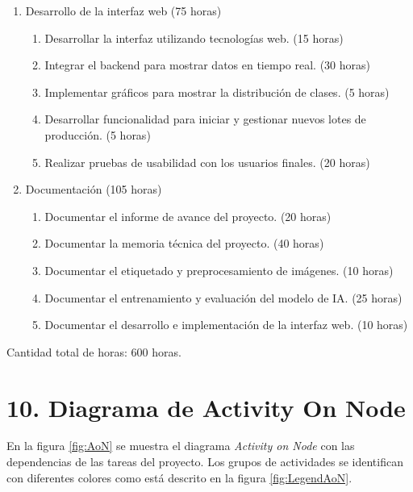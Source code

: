 \documentclass[
11pt, %
]{charter}
\begin{document}
\begin{enumerate}
\begin{enumerate}
	\item Seleccionar y configurar el modelo de IA apropiado. (20 horas)
	\item Entrenar el modelo utilizando las imágenes etiquetadas. (90 horas)
	\item Realizar pruebas de las distintas versiones del modelo con los colaboradores. (20 horas)
	\item Implementar en cada cámara el umbral a partir del cual se contabilizan los nuggets. (30 horas)
	\end{enumerate}
\item Desarrollo de la interfaz web (75 horas)
	\begin{enumerate}
	\item Desarrollar la interfaz utilizando tecnologías web. (15 horas)
	\item Integrar el backend para mostrar datos en tiempo real. (30 horas)
	\item Implementar gráficos para mostrar la distribución de clases. (5 horas)
	\item Desarrollar funcionalidad para iniciar y gestionar nuevos lotes de producción. (5 horas)
	\item Realizar pruebas de usabilidad con los usuarios finales. (20 horas)
	\end{enumerate}
\item Documentación (105 horas)
	\begin{enumerate}
	\item Documentar el informe de avance del proyecto. (20 horas)
	\item Documentar la memoria técnica del proyecto. (40 horas)
	\item Documentar el etiquetado y preprocesamiento de imágenes. (10 horas)
	\item Documentar el entrenamiento y evaluación del modelo de IA. (25 horas)
	\item Documentar el desarrollo e implementación de la interfaz web. (10 horas)
	\end{enumerate}
\end{enumerate}

Cantidad total de horas: 600 horas.

\section{10. Diagrama de Activity On Node}
\label{sec:AoN}

En la figura \ref{fig:AoN} se muestra el diagrama \textit{Activity on Node} con las dependencias de las tareas del proyecto. Los grupos de actividades se identifican con diferentes colores como está descrito en la figura \ref{fig:LegendAoN}.
\end{document}
